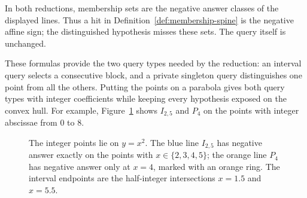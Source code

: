 In both reductions, membership sets are the negative answer classes
of the displayed lines. Thus a hit in
Definition~\ref{def:membership-spine} is the negative affine sign;
the distinguished hypothesis misses these sets. The query itself
is unchanged.



These formulas provide the two query types needed by the reduction:
an interval query selects a consecutive block, and a private
singleton query distinguishes one point from all the others.
Putting the points on a parabola gives both query types with integer
coefficients while keeping every hypothesis exposed on the convex
hull. For example, Figure~\ref{fig:parabola-queries} shows
$I_{2,5}$ and $P_4$ on the points with integer abscissae from $0$ to $8$.

\begin{figure}[tbp]
\centering
{}
\caption{The integer points lie on $y=x^2$. The blue line
$I_{2,5}$ has negative answer exactly on the points with
$x\in\{2,3,4,5\}$; the orange line $P_4$ has negative answer only
at $x=4$, marked with an orange ring. The interval endpoints are
the half-integer intersections $x=1.5$ and $x=5.5$.}
\label{fig:parabola-queries}
\end{figure}

